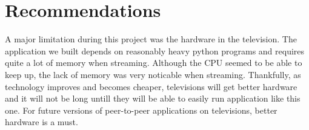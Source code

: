 \chapter{Recommendations}
\label{sec:recommendations}

A major limitation during this project was the hardware in the television. The application we built depends on reasonably heavy python programs and requires quite a lot of memory when streaming. Although the CPU seemed to be able to keep up, the lack of memory was very noticable when streaming. Thankfully, as technology improves and becomes cheaper, televisions will get better hardware and it will not be long untill they will be able to easily run application like this one. For future versions of peer-to-peer applications on televisions, better hardware is a must.

